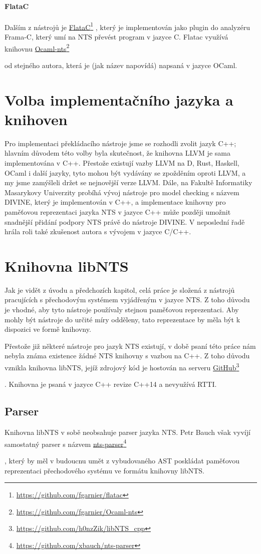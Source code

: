 \documentclass[12pt]{fithesis2}
\newcommand\fnurl[2]{%
  \href{#2}{#1}\footnote{\url{#2}}%
}
\begin{document}
\paragraph{FlataC}
Dalším z nástrojů je
\fnurl{FlataC}{https://github.com/fgarnier/flatac},
který je implementován jako plugin do analyzéru \mbox{Frama-C}, který umí na NTS převést program v jazyce C.
Flatac využívá knihovnu
\fnurl{Ocaml-nts}{https://github.com/fgarnier/Ocaml-nts}
od stejného autora, která je (jak název napovídá) napsaná v jazyce OCaml.

\section{Volba implementačního jazyka a knihoven}
Pro implementaci překládacího nástroje jsme se rozhodli zvolit jazyk C++; hlavním důvodem této volby byla skutečnost, že knihovna LLVM je sama implementována v C++. Přestože existují vazby LLVM na D, Rust, Haskell, OCaml i další jazyky, tyto mohou být vydávány se zpožděním oproti LLVM, a my jsme zamýšleli držet se nejnovější verze LLVM. Dále, na Fakultě Informatiky Masarykovy Univerzity probíhá vývoj nástroje pro model checking s názvem DIVINE, který je implementován v C++, a implementace knihovny pro paměťovou reprezentaci jazyka NTS v jazyce C++ může později umožnit snadnější přidání podpory NTS právě do nástroje DIVINE\cite{BBH+13}. V neposlední řadě hrála roli také zkušenost autora s vývojem v jazyce C/C++.

\section{Knihovna libNTS}
Jak je vidět z úvodu a předchozích kapitol, celá práce je složená z nástrojů pracujících s přechodovým systémem vyjádřeným v jazyce NTS. Z toho důvodu je vhodné, aby tyto nástroje používaly stejnou paměťovou reprezentaci. Aby mohly být nástroje do určité míry odděleny, tato reprezentace by měla být k dispozici ve formě knihovny.

Přestože již některé nástroje pro jazyk NTS existují, v době psaní této práce nám nebyla známa existence žádné NTS knihovny s vazbou na C++. Z toho důvodu vznikla knihovna libNTS, jejíž zdrojový kód je hostován na serveru
\fnurl{GitHub}{https://github.com/h0nzZik/libNTS_cpp}
. Knihovna je psaná v jazyce C++ revize C++14 a nevyužívá RTTI.

\subsection{Parser}
Knihovna libNTS v sobě neobsahuje parser jazyka NTS. Petr Bauch však vyvíjí samostatný parser s názvem
\fnurl{nts-parser}{https://github.com/xbauch/nts-parser}
, který by měl v budoucnu umět z vybudovaného AST poskládat paměťovou reprezentaci přechodového systému ve formátu knihovny libNTS.
\end{document}

